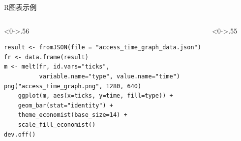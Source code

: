 \documentclass[utf8,dvipsnames,aspectratio=169]{beamer}
\begin{document}
\begin{frame}[fragile]{R图表示例} 	%
	\begin{columns}
		\begin{column}<0->{.56\textwidth}
			\smaller[2]
			\begin{verbatim}
result <- fromJSON(file = "access_time_graph_data.json")
fr <- data.frame(result)
m <- melt(fr, id.vars="ticks", 
          variable.name="type", value.name="time")
png("access_time_graph.png", 1280, 640)
    ggplot(m, aes(x=ticks, y=time, fill=type)) +
    geom_bar(stat="identity") +
    theme_economist(base_size=14) + 
    scale_fill_economist()
dev.off()
			\end{verbatim}
		\end{column}
	\begin{column}<0->{.55\textwidth}
		\begin{figure}[thpb]
			\centering
			\label{fig:r1}
		\end{figure}
	\end{column}
	\end{columns}
\end{frame}
\end{document}
